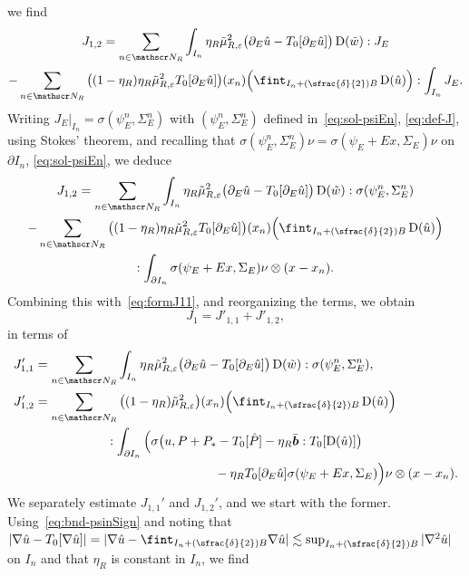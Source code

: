 \documentclass[10pt]{amsart}
\let\mathcal\mathscr
\newcommand{\Psfrac}[2]{(\sfrac{#1}{#2})}
\theoremstyle{plain}
\theoremstyle{definition}
\newcommand{\e}{\varepsilon}
\newcommand{\Nc}{\mathcal N}
\newcommand{\D}{\operatorname{D}}
\newcommand{\bb}{\bar{\boldsymbol b}}
\begin{document}
we find
\begin{multline*}
J_{1,2}=\sum_{n\in\Nc_R}\int_{I_n}\eta_R\tilde\mu_{R,\e}^2\big(\partial_E\hat u-T_0[\partial_E\hat u]\big)\D(\tilde w):J_E\\
-\sum_{n\in\Nc_R}\big((1-\eta_R)\eta_R\tilde\mu_{R,\e}^2T_0[\partial_E\hat u]\big)(x_n)\Big(\fint_{I_n+\Psfrac\delta2 B}\D(\hat u)\Big):\int_{I_n}J_E.
\end{multline*}
Writing $J_E|_{I_n}=\sigma(\psi_E^n,\Sigma_E^n)$ with $(\psi_E^n,\Sigma_E^n)$ defined in~\eqref{eq:sol-psiEn}, \cf \eqref{eq:def-J}, using Stokes' theorem,
and recalling that $\sigma(\psi_E^n,\Sigma_E^n)\nu=\sigma(\psi_E+Ex,\Sigma_E)\nu$ on $\partial I_n$, \cf \eqref{eq:sol-psiEn},
we deduce
\begin{multline*}
J_{1,2}=\sum_{n\in\Nc_R}\int_{I_n}\eta_R\tilde\mu_{R,\e}^2\big(\partial_E\hat u-T_0[\partial_E\hat u]\big)\D(\tilde w):\sigma(\psi_E^n,\Sigma_E^n)\\
-\sum_{n\in\Nc_R}\big((1-\eta_R)\eta_R\tilde\mu_{R,\e}^2T_0[\partial_E\hat u]\big)(x_n)\Big(\fint_{I_n+\Psfrac\delta2 B}\D(\hat u)\Big)\\
:\int_{\partial I_n}\sigma(\psi_E+Ex,\Sigma_E)\nu\otimes(x-x_n).
\end{multline*}
Combining this with~\eqref{eq:formJ11}, and reorganizing the terms, we obtain
\begin{equation*}
J_1=J'_{1,1}+J'_{1,2},
\end{equation*}
in terms of
\begin{align*}
J'_{1,1}&= \sum_{n\in\Nc_R}\int_{I_n}\eta_R\tilde\mu_{R,\e}^2\big(\partial_E\hat u-T_0[\partial_E\hat u]\big)\D(\tilde w):\sigma(\psi_E^n,\Sigma_E^n),\\
J'_{1,2}&= \sum_{n\in\Nc_R}\big((1-\eta_R)\tilde\mu_{R,\e}^2\big)(x_n)\Big(\fint_{I_n+\Psfrac\delta2 B}\D(\hat u)\Big)\\
&\hspace{2cm}:\int_{\partial I_n}\Big(\sigma\big(u,P+P_*-T_0[\hat P]-\eta_R\bb:T_0[\D(\hat u)]\big)\\
&\hspace{5 cm}-\eta_R T_0[\partial_E\hat u]\sigma(\psi_E+Ex,\Sigma_E)\Big)\nu\otimes(x-x_n).
\end{align*}
We separately estimate $J_{1,1}'$ and $J_{1,2}'$, and we start with the former.
Using~\eqref{eq:bnd-psinSign} and noting that $|\nabla\hat u-T_0[\nabla\hat u]|=|\nabla\hat u-\fint_{I_n+\Psfrac\delta2 B}\nabla\hat u|\lesssim\sup_{I_n+\Psfrac\delta2 B}|\nabla^2\hat u|$ on $I_n$ and that $\eta_R$ is constant in $I_n$, we find
\end{document}

